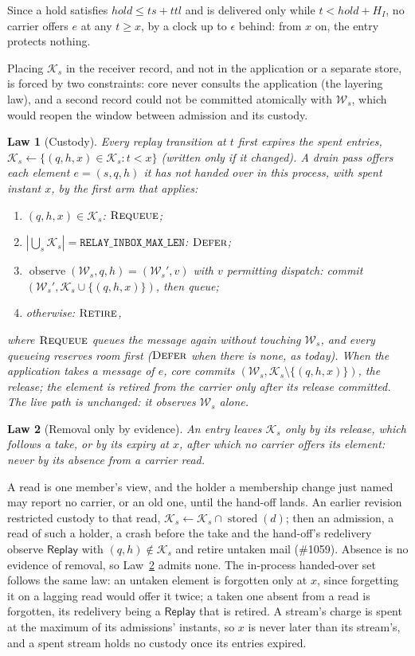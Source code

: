 \documentclass[journal]{IEEEtran}
\newtheorem{law}{Law}
\newcommand{\obs}{\operatorname{observe}}
\newcommand{\stored}{\operatorname{stored}}
\newcommand{\Retire}{\textsc{Retire}}
\newcommand{\Requeue}{\textsc{Requeue}}
\newcommand{\Defer}{\textsc{Defer}}
\newcommand{\K}{\mathcal{K}}
\newcommand{\W}{\mathcal{W}}
\newcommand{\issue}[1]{\#{#1}}
\begin{document}
Since a hold satisfies $\mathit{hold}\le\mathit{ts}+\mathit{ttl}$ and is delivered only while
$t<\mathit{hold}+H_I$, no carrier offers $e$ at any $t\ge x$, by a clock up to $\epsilon$ behind:
from $x$ on, the entry protects nothing.

Placing $\K_s$ in the receiver record, and not in the application or a separate store, is
forced by two constraints: core never consults the application (the layering law), and a
second record could not be committed atomically with $\W_s$, which would reopen the window
between admission and its custody.

\begin{law}[Custody]\label{law:custody}
Every replay transition at $t$ first expires the spent entries,
$\K_s\leftarrow\{(q,h,x)\in\K_s:t<x\}$ (written only if it changed).  A drain pass offers
each element $e=(s,q,h)$ it has not handed over in this process, with spent instant $x$,
by the first arm that applies:
\begin{enumerate}[leftmargin=1.5em]
\item $(q,h,x)\in\K_s$: $\Requeue$;
\item $|\bigcup_s\K_s|=\mathtt{RELAY\_INBOX\_MAX\_LEN}$: $\Defer$;
\item $\obs(\W_s,q,h)=(\W_s',v)$ with $v$ permitting dispatch: commit
$(\W_s',\K_s\cup\{(q,h,x)\})$, then queue;
\item otherwise: $\Retire$,
\end{enumerate}
where $\Requeue$ queues the message again without touching $\W_s$, and every queueing
reserves room first ($\Defer$ when there is none, as today).  When the application takes a
message of $e$, core commits $(\W_s,\K_s\setminus\{(q,h,x)\})$, the \emph{release}; the
element is retired from the carrier only after its release committed.  The live path is
unchanged: it observes $\W_s$ alone.
\end{law}

\begin{law}[Removal only by evidence]\label{law:evidence}
An entry leaves $\K_s$ only by its release, which follows a take, or by its expiry at $x$,
after which no carrier offers its element: never by its absence from a carrier read.
\end{law}

A read is one member's view, and the holder a membership change just named may report no
carrier, or an old one, until the hand-off lands.  An earlier revision restricted custody to
that read, $\K_s\leftarrow\K_s\cap\stored(d)$; then an admission, a read of such a holder, a
crash before the take and the hand-off's redelivery observe $\mathsf{Replay}$ with
$(q,h)\notin\K_s$ and retire untaken mail (\issue{1059}).  Absence is no evidence of removal,
so Law~\ref{law:evidence} admits none.  The in-process handed-over set follows the same law:
an untaken element is forgotten only at $x$, since forgetting it on a lagging read would offer
it twice; a taken one absent from a read is forgotten, its redelivery being a
$\mathsf{Replay}$ that is retired.  A stream's charge is spent at the maximum of its
admissions' instants, so $x$ is never later than its stream's, and a spent stream holds no
custody once its entries expired.
\end{document}
